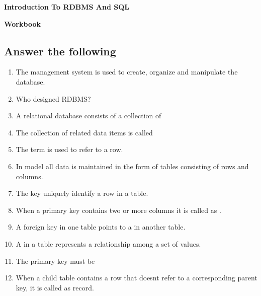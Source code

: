\documentclass[11pt,a4paper]{article}
\begin{document}
\centerline{\huge{\textbf{Introduction To RDBMS And SQL}}}

\vspace{1pc}
\centerline{\Large{ \textbf{Workbook}}}
\subsection*{Answer the following}
\begin{enumerate}\itemsep10pt
\item The \underline{\hspace{3cm}} management system is used to create, organize and manipulate the database.
\item Who designed RDBMS? \underline{\hspace{3cm}}
\item A relational database consists of a collection of \underline{\hspace{3cm}}
\item The collection of related data items is called \underline{\hspace{3cm}}
\item The term \underline{\hspace{3cm}} is used to refer to a row.
\item In \underline{\hspace{3cm}} model all data is maintained in the form of tables consisting of rows and columns.
\item The \underline{\hspace{3cm}} key uniquely identify a row in a table.
\item When a primary key contains two or more columns it is called as \underline{\hspace{3cm}}.
\item A foreign key in one table points to a \underline{\hspace{3cm}} in another table.
\item A \underline{\hspace{3cm}} in a table represents a relationship among a set of values.
\item The primary key must be \underline{\hspace{3cm}}
\item When a child table contains a row that doesnt refer to a corresponding parent key, it is called as \underline{\hspace{3cm}} record.
\end{enumerate}
\end{document}
